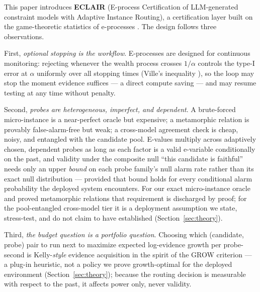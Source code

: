 \documentclass[pdflatex,sn-mathphys-num]{sn-jnl}
\theoremstyle{thmstyleone}
\theoremstyle{thmstyletwo}
\begin{document}
This paper introduces \textbf{ECLAIR} (E-process Certification of
LLM-generated constraint models with Adaptive Instance Routing), a
certification layer built on the game-theoretic statistics of
e-processes \cite{ramdas2023game, shafer2021testing, grunwald2024safe}.
The design follows three observations.

First, \emph{optional stopping is the workflow}. E-processes are
designed for continuous monitoring: rejecting whenever the wealth
process crosses $1/\alpha$ controls the type-I error at $\alpha$
uniformly over all stopping times (Ville's inequality
\cite{ville1939etude}), so the loop may stop the moment evidence
suffices --- a direct compute saving --- and may resume testing at any
time without penalty.

Second, \emph{probes are heterogeneous, imperfect, and dependent}.
A brute-forced micro-instance is a near-perfect oracle but expensive;
a metamorphic relation is provably false-alarm-free but weak; a
cross-model agreement check is cheap, noisy, and entangled with the
candidate pool. E-values multiply across adaptively chosen, dependent
probes as long as each factor is a valid e-variable conditionally on
the past, and validity under the composite null ``this candidate is faithful''
needs only an upper \emph{bound} on each probe family's null alarm
rate rather than its exact null distribution --- provided that bound
holds for every conditional alarm probability the deployed system
encounters. For our exact micro-instance oracle and proved
metamorphic relations that requirement is discharged by proof; for
the pool-entangled cross-model tier it is a deployment assumption we
state, stress-test, and do not claim to have established
(Section~\ref{sec:theory}).

Third, \emph{the budget question is a portfolio question}. Choosing
which (candidate, probe) pair to run next to maximize expected
log-evidence growth per probe-second is Kelly-\emph{style} evidence
acquisition in the spirit of the GROW criterion
\cite{kelly1956new, grunwald2024safe} --- a plug-in heuristic, not a
policy we prove growth-optimal for the deployed environment
(Section~\ref{sec:theory}); because the routing decision is
measurable with respect to the past, it affects power only, never
validity.
\end{document}
